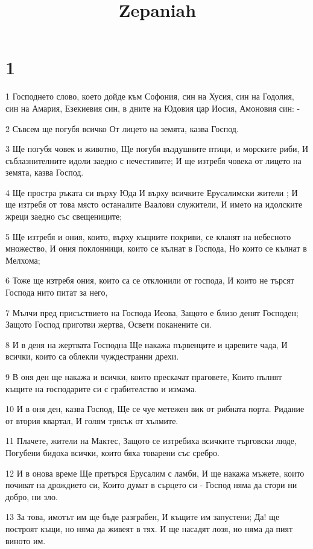 

\title{Zepaniah}


\chapter{1}

\par 1 Господнето слово, което дойде към Софония, син на Хусия, син на Годолия, син на Амария, Езекиевия син, в дните на Юдовия цар Иосия, Амоновия син: -
\par 2 Съвсем ще погубя всичко От лицето на земята, казва Господ.
\par 3 Ще погубя човек и животно, Ще погубя въздушните птици, и морските риби, И съблазнителните идоли заедно с нечестивите; И ще изтребя човека от лицето на земята, казва Господ.
\par 4 Ще простра ръката си върху Юда И върху всичките Ерусалимски жители ; И ще изтребя от това място останалите Ваалови служители, И името на идолските жреци заедно със свещениците;
\par 5 Ще изтребя и ония, които, върху къщните покриви, се кланят на небесното множество, И ония поклонници, които се кълнат в Господа, Но които се кълнат в Мелхома;
\par 6 Тоже ще изтребя ония, които са се отклонили от господа, И които не търсят Господа нито питат за него,
\par 7 Мълчи пред присъствието на Господа Иеова, Защото е близо денят Господен; Защото Господ приготви жертва, Освети поканените си.
\par 8 И в деня на жертвата Господна Ще накажа първенците и царевите чада, И всички, които са облекли чуждестранни дрехи.
\par 9 В оня ден ще накажа и всички, които прескачат праговете, Които пълнят къщите на господарите си с грабителство и измама.
\par 10 И в оня ден, казва Господ, Ще се чуе метежен вик от рибната порта. Ридание от втория квартал, И голям трясък от хълмите.
\par 11 Плачете, жители на Мактес, Защото се изтребиха всичките търговски люде, Погубени бидоха всички, които бяха товарени със сребро.
\par 12 И в онова време Ще претърся Ерусалим с ламби, И ще накажа мъжете, които почиват на дрождието си, Които думат в сърцето си - Господ няма да стори ни добро, ни зло.
\par 13 За това, имотът им ще бъде разграбен, И къщите им запустени; Да! ще построят къщи, но няма да живеят в тях. И ще насадят лозя, но няма да пият виното им.
